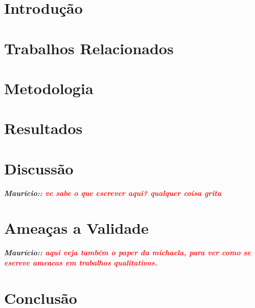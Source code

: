 \documentclass[sigconf]{acmart}
\newcommand{\remark}[2]{{\small\textsl{\textbf{#1: #2}}}}
\newcommand{\mau}[1]{\remark{Maurício:}{\textcolor{red}{#1}}}
\begin{document}




\maketitle

\section{Introdu\c{c}\~ao}


\section{Trabalhos Relacionados}


\section{Metodologia}


\section{Resultados}


\section{Discuss\~ao}

\mau{vc sabe o que escrever aqui? qualquer coisa grita}


\section{Amea\c{c}as a Validade}

\mau{aqui veja também o paper da michaela, para ver como se escreve ameacas em trabalhos qualitativos.}


\section{Conclus\~ao}


% 


 
\end{document}
